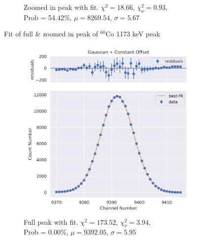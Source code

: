 \documentclass[11pt,a4paper]{article}
\newcommand{\element}[2]{$^{#2}\textrm{#1}$}
\begin{document}
\begin{figure}[H]
\begin{subfigure}{.5\linewidth}
    \caption{Zoomed in peak with fit. $\chi^2 = 18.66$, $\chi^2_\nu = 0.93$, \\ Prob = 54.42\%, $\mu = 8269.54$, $\sigma = 5.67$}
  \end{subfigure}
  \caption{Fit of full \& zoomed in peak of \element{Co}{60} 1173 keV peak}
\end{figure}
\begin{figure}[H]
  \centering
  \begin{subfigure}{.5\linewidth}
    \centering
    \includegraphics[width=\linewidth]{./Images/Cobalt60/Gauss/Gauss_2_Full.png}
    \caption{Full peak with fit. $\chi^2 = 173.52$, $\chi^2_\nu = 3.94$, \\ Prob = 0.00\%, $\mu = 9392.05$, $\sigma = 5.95$}
  \end{subfigure}%
  \begin{subfigure}{.5\linewidth}
    \centering

\end{subfigure}
\end{figure}
\end{document}
